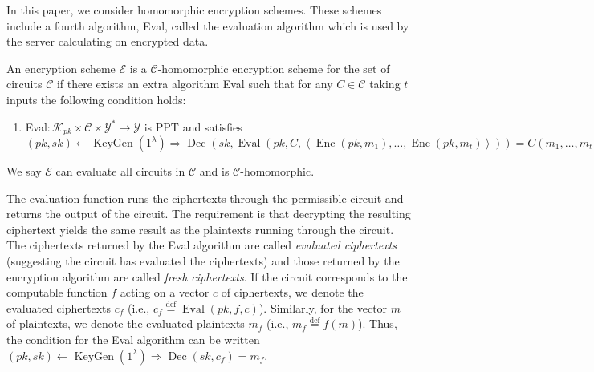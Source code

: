 In this paper, we consider homomorphic encryption schemes. These schemes include a fourth algorithm, Eval, called the evaluation algorithm which is used by the server calculating on encrypted data.
\begin{definition}
An encryption scheme $\mathcal{E}$ is a $\mathcal{C}$-homomorphic encryption scheme for the set of circuits $\mathcal{C}$ if there exists an extra algorithm Eval such that for any $C \in \mathcal{C}$ taking $t$ inputs the following condition holds:
\begin{enumerate}[label={$\bullet$}]
    \item  Eval$ \colon  \mathcal{K}_{pk} \times \mathcal{C} \times \mathcal{Y}^* \to \mathcal{Y}$ is PPT and satisfies $(pk,sk) \leftarrow \operatorname{KeyGen}(1^{\lambda}) \Rightarrow \operatorname{Dec}(sk, \operatorname{Eval}(pk, C, \left\langle \operatorname{Enc}(pk, m_1), \dots , \operatorname{Enc}(pk, m_t) \right\rangle)) = C(m_1, \ldots, m_t)$
\end{enumerate}
We say $\mathcal{E}$ can evaluate all circuits in $\mathcal{C}$ and is $\mathcal{C}$-homomorphic.
\end{definition}


The evaluation function runs the ciphertexts through the permissible circuit and returns the output of the circuit. The requirement is that decrypting the resulting ciphertext yields the same result as the plaintexts running through the circuit. The ciphertexts returned by the Eval algorithm are called \textit{evaluated ciphertexts} (suggesting the circuit has evaluated the ciphertexts) and those returned by the encryption algorithm are called \textit{fresh ciphertexts}. If the circuit corresponds to the computable function $f$ acting on a vector $c$ of ciphertexts, we denote the evaluated ciphertexts $c_f$ (i.e., $c_f \stackrel{\mathrm{def}}{=} \operatorname{Eval}(pk, f, c)$). Similarly, for the vector $m$ of plaintexts, we denote the evaluated plaintexts $m_f$ (i.e., $m_f \stackrel{\mathrm{def}}{=} f(m)$). Thus, the condition for the Eval algorithm can be written $(pk,sk) \leftarrow \operatorname{KeyGen}(1^{\lambda}) \Rightarrow \operatorname{Dec}(sk, c_f) = m_f$.

